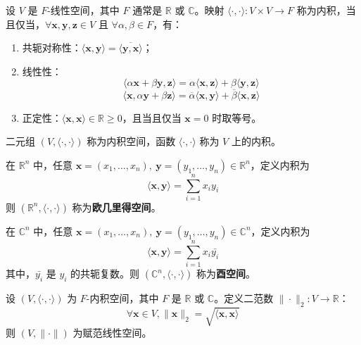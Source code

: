 \begin{definition}
    设 $ V $ 是 $F$-线性空间，其中 $F$ 通常是 $\mathbb{R}$ 或 $\mathbb{C}$。映射 $ \langle\cdot,\cdot\rangle:V\times V\to F $ 称为内积，当且仅当，$ \forall \mathbf{x},\mathbf{y},\mathbf{z}\in V $ 且 $ \forall \alpha,\beta\in F $，有：
    \begin{enumerate}
        \item 共轭对称性：$ \langle \mathbf{x},\mathbf{y}\rangle=\overline{\langle \mathbf{y},\mathbf{x}\rangle} $；
        \item 线性性：
        \[
            \langle \alpha \mathbf{x}+ \beta \mathbf{y},\mathbf{z}\rangle=\alpha\langle \mathbf{x},\mathbf{z}\rangle+\beta\langle \mathbf{y},\mathbf{z}\rangle
        \]
        \[
            \langle \mathbf{x},\alpha \mathbf{y}+\beta \mathbf{z}\rangle=\overline{\alpha}\langle \mathbf{x},\mathbf{y}\rangle+\overline{\beta}\langle \mathbf{x},\mathbf{z}\rangle
        \]
        \item 正定性：$ \langle \mathbf{x},\mathbf{x}\rangle \in \mathbb{R} \geq 0 $，且当且仅当 $ \mathbf{x}=0 $ 时取等号。
    \end{enumerate}
    二元组 $ (V,\langle\cdot,\cdot\rangle) $ 称为内积空间，函数 $ \langle\cdot,\cdot\rangle $ 称为 $ V $ 上的内积。
    \label{def:inner_product_space}
\end{definition}

\begin{definition}
    在 $\mathbb{R}^n$ 中，任意 $\mathbf{x}=(x_1,\ldots,x_n),\ \mathbf{y}=(y_1,\ldots,y_n)\in \mathbb{R}^n$，定义内积为
    \[
        \langle \mathbf{x},\mathbf{y}\rangle = \sum_{i=1}^{n} x_i y_i
    \]
    则 $ (\mathbb{R}^n,\langle\cdot,\cdot\rangle) $ 称为\textbf{欧几里得空间}。
    \label{def:euclidean_space}
\end{definition}

\begin{definition}
    在 $\mathbb{C}^n$ 中，任意 $\mathbf{x}=(x_1,\ldots,x_n),\ \mathbf{y}=(y_1,\ldots,y_n)\in \mathbb{C}^n$，定义内积为
    \[
        \langle \mathbf{x},\mathbf{y}\rangle = \sum_{i=1}^{n} x_i \bar{y_i}
    \]
    其中，$ \bar{y_i} $ 是 $ y_i $ 的共轭复数。则 $ (\mathbb{C}^n,\langle\cdot,\cdot\rangle) $ 称为\textbf{酉空间}。
    \label{def:unitary_space}
\end{definition}

\begin{proposition}[内积空间诱导的赋范线性空间]
    设 $ (V,\langle\cdot,\cdot\rangle) $ 为 $F$-内积空间，其中 $F$ 是 $\mathbb{R}$ 或 $\mathbb{C}$。定义二范数 $ \|\cdot\|_2:V\to \mathbb{R} $：
    \[
        \forall \mathbf{x}\in V, \|\mathbf{x}\|_2=\sqrt{\langle \mathbf{x},\mathbf{x}\rangle}
    \]
    则 $ (V,\|\cdot\|) $ 为赋范线性空间。
\end{proposition}

